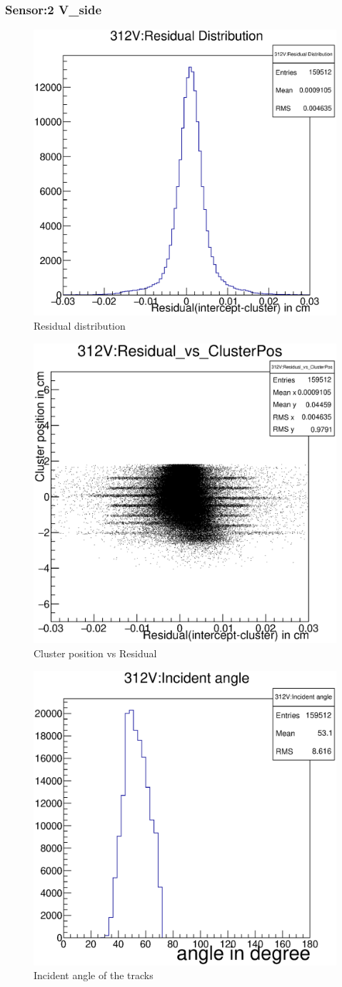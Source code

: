 \documentclass[12pt]{article}
\begin{document}
	\subsubsection{Sensor:2 V\_side}
	\begin{multicols}{3}
		\begin{figure}[H]
			\includegraphics[width=.3\textwidth]{312V:residualplot.eps}	
			\caption{Residual distribution}	
			\label{fig1}	
		\end{figure}
		\begin{figure}[H]
			\includegraphics[width=.3\textwidth]{312V:residual_vs_clusterpos.eps}	
			\caption{Cluster position vs Residual}	
			\label{fig2}	
		\end{figure}
		\begin{figure}[H]
			\includegraphics[width=.3\textwidth]{312V:incident_angle.eps}	
			\caption{Incident angle of the tracks}	
			\label{fig2}	
		\end{figure}
	\end{multicols}
	
\end{document}
